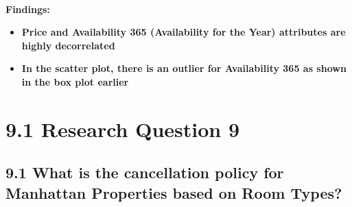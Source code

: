 \documentclass[11pt]{article}
\providecommand{\tightlist}{%
      \setlength{\itemsep}{0pt}\setlength{\parskip}{0pt}}
\begin{document}
    \begin{center}
    \end{center}
    { \hspace*{\fill} \\}
    
    \textbf{Findings:}

\begin{itemize}
\tightlist
\item
  \textbf{Price and Availability 365 (Availability for the Year)
  attributes are highly decorrelated}
\item
  \textbf{In the scatter plot, there is an outlier for Availability 365
  as shown in the box plot earlier}
\end{itemize}

    \hypertarget{research-question-9}{%
\section{9.1 Research Question 9}\label{research-question-9}}

\hypertarget{what-is-the-cancellation-policy-for-manhattan-properties-based-on-room-types}{%
\subsection{9.1 What is the cancellation policy for Manhattan Properties
based on Room
Types?}\label{what-is-the-cancellation-policy-for-manhattan-properties-based-on-room-types}}
\end{document}
